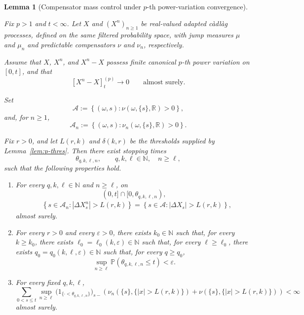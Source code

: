 \documentclass[a4paper,10pt]{article}
\newtheorem{lemma}[thm]{Lemma}
\renewcommand{\P}{\mathbb P}
\begin{document}
\begin{lemma}
[Compensator mass control under \(p\)-th power-variation convergence]
\label{complemma}

Fix \(p>1\) and \(t<\infty\). Let \(X\) and
\((X^n)_{n\ge1}\) be real-valued adapted càdlàg processes, defined
on the same filtered probability space, with jump measures
\(\mu\) and \(\mu_n\) and predictable compensators \(\nu\) and
\(\nu_n\), respectively.

Assume that \(X\), \(X^n\), and \(X^n-X\) possess finite canonical
\(p\)-th power variation on \([0,t]\), and that
\[
        [X^n-X]^{(p)}_t
        \longrightarrow0
        \qquad\text{almost surely}.
\]


Set
\[
        \mathcal A
        :=
        \left\{
        (\omega,s):
        \nu(\omega,\{s\},\mathbb R)>0
        \right\},
\]
and, for \(n\ge1\),
\[
        \mathcal A_n
        :=
        \left\{
        (\omega,s):
        \nu_n(\omega,\{s\},\mathbb R)>0
        \right\}.
\]

Fix \(r>0\), and let \(L(r,k)\) and \(\delta(k,r)\) be the
thresholds supplied by Lemma~\ref{lem:p-thres}. Then there exist stopping times
\[
        \theta_{q,k,\ell,n},
        \qquad
        q,k,\ell\in\mathbb N,\quad n\ge\ell,
\]
such that the following properties hold.

\begin{enumerate}

\item For every \(q,k,\ell\in\mathbb N\) and \(n\ge\ell\), on
\[
        (0,t]\cap[0,\theta_{q,k,\ell,n}),
\]
\[
\begin{aligned}
&\left\{
s\in\mathcal A_n:
|\Delta X^n_s|>L(r,k)
\right\}
=
\left\{
s\in\mathcal A:
|\Delta X_s|>L(r,k)
\right\},
\end{aligned}
\]
almost surely.

\item For every \(r>0\) and every \(\varepsilon>0\), there exists
\(k_0\in\mathbb N\) such that, for every \(k\ge k_0\), there exists
\(\ell_0=\ell_0(k,\varepsilon)\in\mathbb N\) such that, for every
\(\ell\ge\ell_0\), there exists
\(q_0=q_0(k,\ell,\varepsilon)\in\mathbb N\) such that, for every
\(q\ge q_0\),
\[
        \sup_{n\ge\ell}
        \P\left(
        \theta_{q,k,\ell,n}\le t
        \right)
        <
        \varepsilon.
\]

\item For every fixed \(q,k,\ell\),
\[
\sum_{0<s\le t}
\sup_{n\ge\ell}
\bigl(
1_{\{\cdot<\theta_{q,k,\ell,n}\}}
\bigr)_{s-}
\left(
\nu_n(\{s\},\{|x|>L(r,k)\})
+
\nu(\{s\},\{|x|>L(r,k)\})
\right)
<
\infty
\]
almost surely.

\end{enumerate}
\end{lemma}
\end{document}
